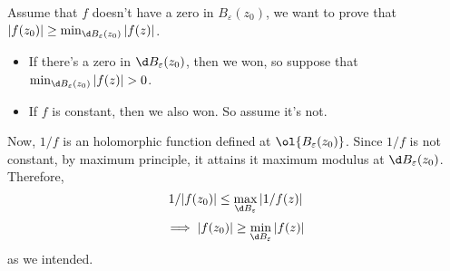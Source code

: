 Assume that $f$ doesn't have a zero in $B_\varepsilon(z_0)$, we want to prove that $|f(z_0)| \geq \min_{\d B_\varepsilon(z_0)} |f(z)|$.
\begin{itemize}
    \item If there's a zero in $\d B_\varepsilon(z_0)$, then we won, so suppose that $\min_{\d B_\varepsilon(z_0)} |f(z)| > 0$.
    \item If $f$ is constant, then we also won. So assume it's not.
\end{itemize}
Now, $1/f$ is an holomorphic function defined at $\ol{B_\varepsilon(z_0)}$. Since $1/f$ is not constant, by maximum principle, it attains it maximum modulus at $\d B_\varepsilon(z_0)$. Therefore, 
\[ 1/|f(z_0)| \leq \max_{\d B_\varepsilon}|1/f(z)|\]
\[ \implies |f(z_0)| \geq \min_{\d B_\varepsilon}|f(z)|\]
as we intended.